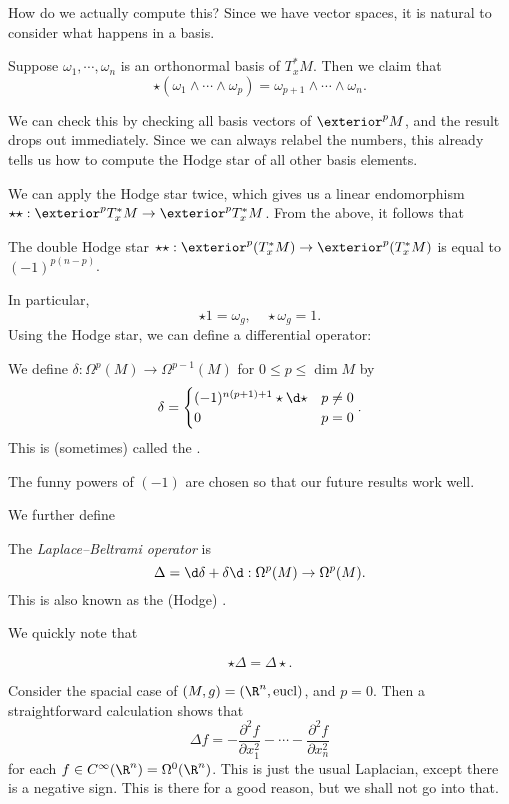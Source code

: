 \documentclass[a4paper]{article}
\begin{document}
How do we actually compute this? Since we have vector spaces, it is natural to consider what happens in a basis.
\begin{prop}
  Suppose $\omega_1, \cdots, \omega_n$ is an orthonormal basis of $T_x^* M$. Then we claim that
  \[
    \star(\omega_1 \wedge \cdots \wedge \omega_p) = \omega_{p + 1} \wedge \cdots \wedge \omega_n.
  \]
\end{prop}
We can check this by checking all basis vectors of $\exterior^p M$, and the result drops out immediately. Since we can always relabel the numbers, this already tells us how to compute the Hodge star of all other basis elements.

We can apply the Hodge star twice, which gives us a linear endomorphism $\star\star: \exterior^p T_x^* M \to \exterior^p T_x^* M$. From the above, it follows that
\begin{prop}
  The double Hodge star $\star\star: \exterior^p (T_x^* M) \to \exterior^p (T_x^* M)$ is equal to $(-1)^{p(n - p)}$.
\end{prop}
In particular,
\[
  \star1 = \omega_g,\quad \star \omega_g = 1.
\]
Using the Hodge star, we can define a differential operator:
\begin{defi}\index{$\delta$}
  We define $\delta: \Omega^p(M) \to \Omega^{p - 1}(M)$ for $0 \leq p \leq \dim M$ by
  \[
    \delta =
    \begin{cases}
      (-1)^{n(p + 1) + 1} \star\d \star & p \not= 0\\
      0 & p = 0
    \end{cases}.
  \]
  This is (sometimes) called the .
\end{defi}
The funny powers of $(-1)$ are chosen so that our future results work well.

We further define
\begin{defi}\index{$\Delta$}
  The \emph{Laplace--Beltrami operator} is
  \[
    \Delta = \d \delta + \delta \d: \Omega^p(M) \to \Omega^p(M).
  \]
  This is also known as the (Hodge) .
\end{defi}
We quickly note that
\begin{prop}
  \[
    \star\Delta = \Delta \star.
  \]
\end{prop}
Consider the spacial case of $(M, g) = (\R^n, \mathrm{eucl})$, and $p = 0$. Then a straightforward calculation shows that
\[
  \Delta f = - \frac{\partial^2 f}{\partial x_1^2} - \cdots - \frac{\partial^2 f}{\partial x_n^2}
\]
for each $f \in C^\infty(\R^n) = \Omega^0(\R^n)$. This is just the usual Laplacian, except there is a negative sign. This is there for a good reason, but we shall not go into that.
\end{document}

